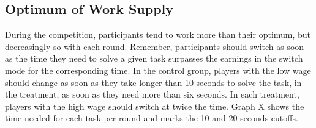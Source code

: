 \begin{table}[!htbp] \centering 
  \caption{Linear Mixed Model - Net Income} 
  \label{table:earnings_lmer}
\end{table} 


\subsection{Optimum of Work Supply}
During the competition, participants tend to work more than their optimum, but decreasingly so with each round. Remember, participants should switch as soon as the time they need to solve a given task surpasses the earnings in the switch mode for the corresponding time. In the control group, players with the low wage should change as soon as they take longer than 10 seconds to solve the task, in the treatment, as soon as they need more than six seconds. In each treatment, players with the high wage should switch at twice the time. Graph X shows the time needed for each task per round and marks the 10 and 20 seconds cutoffs.\\ 

